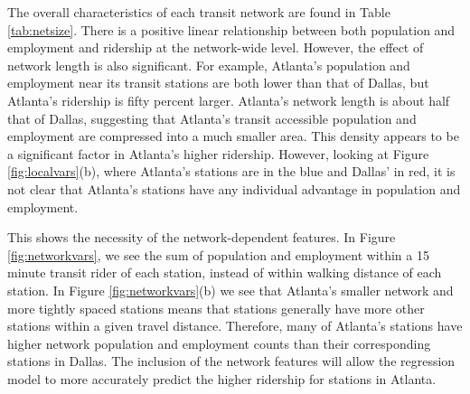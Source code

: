 \documentclass[11pt]{report}
\begin{document}
The overall characteristics of each transit network are found in Table \ref{tab:netsize}. There is a positive linear relationship between both population and employment and ridership at the network-wide level. However, the effect of network length is also significant. For example, Atlanta's population and employment near its transit stations are both lower than that of Dallas, but Atlanta's ridership is fifty percent larger. Atlanta's network length is about half that of Dallas, suggesting that Atlanta's transit accessible population and employment are compressed into a much smaller area. This density appears to be a significant factor in Atlanta's higher ridership. However, looking at Figure \ref{fig:localvars}(b), where Atlanta's stations are in the blue and Dallas' in red, it is not clear that Atlanta's stations have any individual advantage in population and employment. 

This shows the necessity of the network-dependent features. In Figure \ref{fig:networkvars}, we see the sum of population and employment within a 15 minute transit rider of each station, instead of within walking distance of each station. In Figure \ref{fig:networkvars}(b) we see that Atlanta's smaller network and more tightly spaced stations means that stations generally have more other stations within a given travel distance. Therefore, many of Atlanta's stations have higher network population and employment counts than their corresponding stations in Dallas. The inclusion of the network features will allow the regression model to more accurately predict the higher ridership for stations in Atlanta. 
\end{document}
